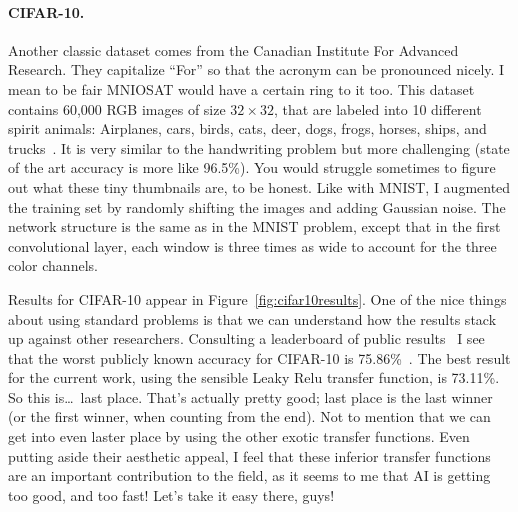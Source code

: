 \documentclass[twocolumn]{article}
\begin{document}
\paragraph{CIFAR-10.}
Another classic dataset comes from the Canadian Institute For Advanced
Research. They capitalize ``For'' so that the acronym can be
pronounced nicely. I mean to be fair MNIOSAT would have a certain ring
to it too. This dataset contains 60,000 RGB images of size $32 \times
32$, that are labeled into 10 different spirit animals: Airplanes,
cars, birds, cats, deer, dogs, frogs, horses, ships, and
trucks~\cite{krizhevsky2009learning}. It is very similar to the
handwriting problem but more challenging (state of the art accuracy is
more like 96.5\%). You would struggle sometimes to figure out what
these tiny thumbnails are, to be honest. Like with MNIST, I augmented
the training set by randomly shifting the images and adding Gaussian
noise. The network structure is the same as in the MNIST problem,
except that in the first convolutional layer, each window is three
times as wide to account for the three color channels.

Results for CIFAR-10 appear in Figure~\ref{fig:cifar10results}. One of
the nice things about using standard problems is that we can
understand how the results stack up against other researchers.
Consulting a leaderboard of public results~\cite{benenson2023are} I
see that the worst publicly known accuracy for CIFAR-10 is
75.86\%~\cite{mcdonnell2015enhanced}. The best result for the current
work, using the sensible Leaky Relu transfer function, is 73.11\%. So
this is\ldots\ last place. That's actually pretty good; last place is
the last winner (or the first winner, when counting from the end). Not
to mention that we can get into even laster place by using the other
exotic transfer functions. Even putting aside their aesthetic appeal,
I feel that these inferior transfer functions are an important
contribution to the field, as it seems to me that AI is getting too
good, and too fast! Let's take it easy there, guys!
\end{document}
